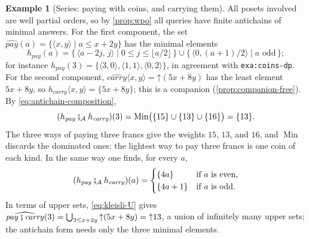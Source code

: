 \documentclass[11pt,a4paper]{article}
\theoremstyle{plain}
\theoremstyle{definition}
\newtheorem{example}[theorem]{Example}
\theoremstyle{remark}
\newcommand{\An}{\mathcal{A}}
\newcommand{\then}{\mathbin{\fatsemi}}
\newcommand{\thenA}{\mathbin{\fatsemi_{\An}}}
\newcommand{\tup}[1]{\langle #1 \rangle}
\newcommand{\up}{\mathord{\uparrow}}
\DeclareMathOperator{\Min}{Min}
\newcommand{\lbl}[1]{\nolinkurl{#1}}
\begin{document}
\begin{example}[Series: paying with coins, and carrying them]
    All posets involved are well partial orders, so by \cref{prop:wpo} all queries have finite antichains of minimal answers.
    For the first component, the set $\widehat{\mathit{pay}}(a) = \{ \tup{x,y} \mid a \leq x + 2y \}$ has the minimal elements
    \begin{equation*}
        h_{\mathit{pay}}(a) = \{\, \tup{a - 2j,\, j} \mid 0 \leq j \leq \lfloor a/2 \rfloor \,\} \cup \{\, \tup{0, (a+1)/2} \mid a \text{ odd} \,\};
    \end{equation*}
    for instance $h_{\mathit{pay}}(3) = \{ \tup{3,0}, \tup{1,1}, \tup{0,2} \}$, in agreement with \lbl{exa:coins-dp}.
    For the second component, $\widehat{\mathit{carry}}\tup{x,y} = \up (5x + 8y)$ has the least element $5x + 8y$, so $h_{\mathit{carry}}\tup{x,y} = \{ 5x + 8y \}$; this is a companion (\cref{prop:companion-free}).
    By \cref{eq:antichain-composition},
    \begin{equation*}
        (h_{\mathit{pay}} \thenA h_{\mathit{carry}})(3) = \Min\bigl( \{15\} \cup \{13\} \cup \{16\} \bigr) = \{13\}.
    \end{equation*}
    The three ways of paying three francs give the weights $15$, $13$, and $16$, and $\Min$ discards the dominated ones: the lightest way to pay three francs is one coin of each kind.
    In the same way one finds, for every $a$,
    \begin{equation*}
        (h_{\mathit{pay}} \thenA h_{\mathit{carry}})(a) = \begin{cases} \{4a\} & \text{if $a$ is even,} \\ \{4a + 1\} & \text{if $a$ is odd.} \end{cases}
    \end{equation*}
    In terms of upper sets, \cref{eq:kleisli-U} gives $\widehat{\mathit{pay} \then \mathit{carry}}(3) = \bigcup_{3 \leq x + 2y} \up (5x + 8y) = \up 13$, a union of infinitely many upper sets; the antichain form needs only the three minimal elements.
\end{example}
\end{document}
